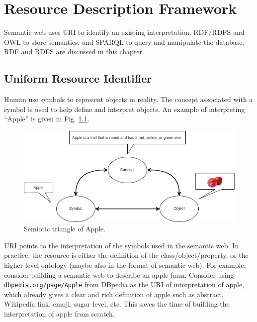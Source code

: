 \chapter{Resource Description Framework}

Semantic web uses URI to identify an existing interpretation, RDF/RDFS and OWL to store semantics, and SPARQL to query and manipulate the database. RDF and RDFS are discussed in this chapter.

\section{Uniform Resource Identifier}

Human use symbols to represent objects in reality. The concept associated with a symbol is used to help define and interpret objects. An example of interpreting ``Apple'' is given in Fig. \ref{fig:semiotictriangle}.
\begin{figure}[htbp]
	\centering
	\includegraphics[width=\textwidth]{./chapters/ch-semanticwebarchitecture/figures/semiotic_triangle.png}
	\caption{Semiotic triangle of Apple.}
	\label{fig:semiotictriangle}
\end{figure}

URI points to the interpretation of the symbols used in the semantic web. In practice, the resource is either the definition of the class/object/property, or the higher-level ontology (maybe also in the format of semantic web). For example, consider building a semantic web to describe an apple farm. Consider using \texttt{dbpedia.org/page/Apple} from DBpedia as the URI of interpretation of apple, which already gives a clear and rich definition of apple such as abstract, Wikipedia link, emoji, sugar level, etc. This saves the time of building the interpretation of apple from scratch.

